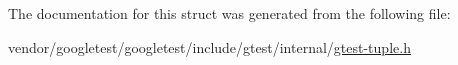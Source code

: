 The documentation for this struct was generated from the following file\+:\begin{DoxyCompactItemize}
\item 
vendor/googletest/googletest/include/gtest/internal/\hyperlink{gtest-tuple_8h}{gtest-\/tuple.\+h}\end{DoxyCompactItemize}
